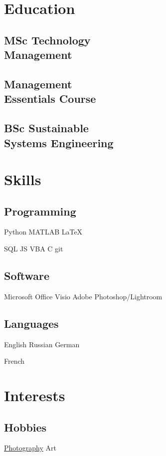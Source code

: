 \documentclass[]{plushcv}
\begin{document}
\begin{minipage}[t]{0.25\textwidth} 


\section{Education} 
	\subsection{MSc Technology\\ Management}
	\sectionsep
	
	\subsection{Management\\ Essentials Course}
	\sectionsep

	\subsection{BSc Sustainable\\Systems Engineering}
	\sectionsep

\section{Skills}
	\subsection{Programming}
	Python  \tb MATLAB \tb \LaTeX
	\subskip
	
	SQL \tb JS \tb VBA \tb C \tb git 
	\sectionsep
	
	\subsection{Software}
	Microsoft Office \tb Visio \tb Adobe Photoshop/Lightroom
	\sectionsep
	
	\subsection{Languages}
	English \tb Russian \tb German
	\subskip
	
	French
	\sectionsep


\section{Interests}
	\subsection{Hobbies}
	\href{https://daniilaktanka.myportfolio.com/}{Photography} \tb Art

\end{minipage} 
\end{document}
